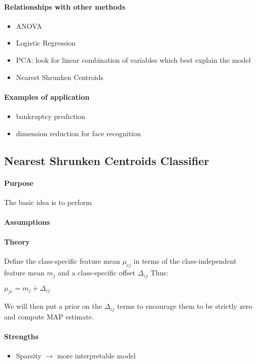 \paragraph{Relationships with other methods}
\begin{itemize}
    \item ANOVA
    \item Logistic Regression
    \item PCA: look for linear combination of variables which best explain the model
    \item Nearest Shrunken Centroids
\end{itemize}

\paragraph{Examples of application}
\begin{itemize}
    \item bankruptcy prediction
    \item dimension reduction for face recognition
\end{itemize}



\subsection{Nearest Shrunken Centroids Classifier}
\paragraph{Purpose}
The basic idea is to perform  
\paragraph{Assumptions}
\paragraph{Theory}
Define the class-specific feature mean $\mu_{cj}$ in terms of the class-independent 
feature mean $m_{j}$ and a class-specific offset $\Delta_{cj}$ Thus:
\begin{center}
    $\mu_{jc} = m_{j} + \Delta_{cj}$
\end{center}
We will then put a prior on the $\Delta_{cj}$ terms to encourage them to be strictly
zero and compute MAP estimate.

\paragraph{Strengths}
\begin{itemize}
    \item Sparsity $\rightarrow$ more interpretable model
\end{itemize}

